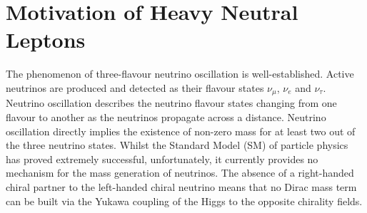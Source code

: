 \section{Motivation of Heavy Neutral Leptons}
\label{sec2Overview}



The phenomenon of three-flavour neutrino oscillation is well-established.
Active neutrinos are produced and detected as their flavour states $\nu_\mu$, $\nu_e$ and $\nu_\tau$.
Neutrino oscillation describes the neutrino flavour states changing from one flavour to another as the neutrinos propagate across a distance.
Neutrino oscillation directly implies the existence of non-zero mass for at least two out of the three neutrino states.
Whilst the Standard Model (SM) of particle physics has proved extremely successful, unfortunately, it currently provides no mechanism for the mass generation of neutrinos.
The absence of a right-handed chiral partner to the left-handed chiral neutrino means that no Dirac mass term can be built via the Yukawa coupling of the Higgs to the opposite chirality fields.

